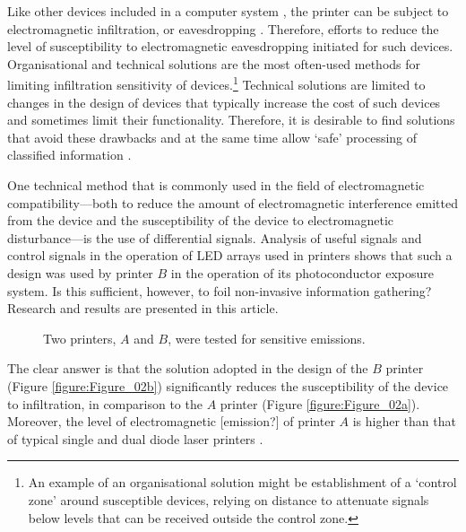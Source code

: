 \documentclass[10pt,a4paper]{article}
\begin{document}
Like other devices included in a computer system \cite{Kuhn2002,Kubiak2016a},
the printer can be subject to electromagnetic infiltration, or eavesdropping
\cite{Ketenci2015a,Kubiak2016b}. Therefore, efforts to reduce the level of
susceptibility to electromagnetic eavesdropping initiated for such devices.
Organisational and technical solutions \cite{Kubiak2006a} are the most
often-used methods for limiting infiltration
sensitivity of devices.\footnote{An example of an organisational solution
might be establishment of a `control zone' around susceptible devices,
relying on distance to attenuate signals below levels that can be received
outside the control zone.} Technical solutions are limited to changes in the
design of devices that typically increase the cost of such devices and
sometimes limit their functionality. Therefore, it is desirable to find
solutions that avoid these drawbacks and at the same time allow `safe'
processing of classified information \cite{Wasfy2011a,Goel2012a}.

One technical method that is commonly used in the field of electromagnetic
compatibility---both to reduce the amount of electromagnetic interference
emitted from the device and the susceptibility of the device to
electromagnetic disturbance---is the use of differential signals. Analysis
of useful signals and control signals \cite{Kubiak2017d} in the operation of
LED arrays
used in printers shows that such a design was used by printer $B$ in the
operation of its photoconductor exposure system. Is this sufficient, however,
to foil non-invasive information gathering? Research and results are
presented in this article.

\begin{figure*}[ht]
    \centering
    \hfil
    \caption{Two printers, $A$ and $B$, were tested for sensitive emissions.}
    \label{figure:Figure_02}
\end{figure*}

The clear answer is that the solution adopted in the design of the $B$
printer (Figure \ref{figure:Figure_02b}) significantly reduces the
susceptibility of the device to infiltration, in comparison to the $A$
printer (Figure \ref{figure:Figure_02a}). Moreover, the level of
electromagnetic [emission?] of printer $A$ is higher than that of
typical single and dual diode laser printers \cite{Kubiak2014b}.
\end{document}
